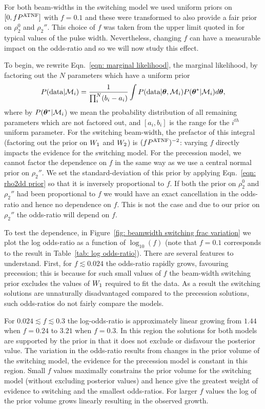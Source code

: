 \documentclass[../full_thesis/full_thesis.tex]{subfiles}
\begin{document}
For both beam-widths in the switching model we used uniform priors on $[0,
fP^{\mathrm{ATNF}}]$ with $f=0.1$ and these were transformed to also provide a fair prior
on $\rho_2^0$ and $\rho_2''$. This choice of $f$ was taken from the upper limit
quoted in \citet{Lyne1988} for typical values of the pulse width.
Nevertheless, changing $f$ can have a measurable impact on the odds-ratio and
so we will now study this effect.

To begin, we rewrite
Eqn.~\eqref{eqn: marginal likelihood}, the marginal
likelihood, by factoring out the $N$ parameters which have a uniform prior
\begin{align}
P(\textrm{data}| \mathcal{M}_i) =
\frac{1}{\prod_{i}^{N}(b_i - a_i)}
\int P(\textrm{data}| \boldsymbol{\theta}, \mathcal{M}_i)P(\boldsymbol{\theta}^{*}|\mathcal{M}_{i}) d\boldsymbol{\theta},
\end{align}
where by $P(\boldsymbol{\theta}^{*}| \mathcal{M}_i$) we mean the probability distribution of all
remaining parameters which are not factored out, and $[a_i, b_i]$ is the range
for the $i^{th}$ uniform parameter.  For the switching beam-width, the prefactor of
this integral (factoring out the prior on $W_{1}$ and $W_{2}$) is
$(fP^{\mathrm{ATNF}})^{-2}$: varying $f$ directly impacts the evidence for the switching
model. For the precession model, we cannot factor the dependence on $f$ in the
same way as we use a central normal prior on $\rho_2''$.  We set the
standard-deviation of this prior by applying Eqn.~\eqref{eqn: rho2dd prior} so
that it is inversely proportional to $f$. If both the prior on $\rho_2^0$ and
$\rho_2''$ had been proportional to $f$ we would have an exact cancellation in
the odds-ratio and hence no dependence on $f$. This is not the case and due to
our prior on $\rho_2''$ the odds-ratio will depend on $f$.

To test the dependence, in Figure~\ref{fig: beamwidth switching frac variation}
we plot the log odds-ratio as a function of $\log_{10}(f)$ (note that $f=0.1$
corresponds to the result in Table~\ref{tab: log odds-ratio}). There are
several features to understand. First, for $f\lesssim 0.024$ the
odds-ratio rapidly grows, favouring precession; this is because for such small
values of $f$ the beam-width switching prior excludes the values of
$W_{1}$ required to fit the data. As a result the switching solutions are
unnaturally disadvantaged compared to the precession solutions, such odds-ratios do not
fairly compare the models.

For $0.024 \lesssim f \lesssim 0.3$ the log-odds-ratio is approximately linear
growing from $1.44$ when $f=0.24$ to $3.21$ when $f=0.3$. In this region the
solutions for both models are supported by the prior in that it does not
exclude or disfavour the posterior value. The variation in the odds-ratio
results from changes in the prior volume of the switching model, the evidence
for the precession model is constant in this region.  Small $f$ values
maximally constrains the prior volume for the switching model (without
excluding posterior values) and hence give the greatest weight of evidence to
switching and the smallest odds-ratios. For larger $f$ values the log of the
prior volume grows linearly resulting in the observed growth.
\end{document}
